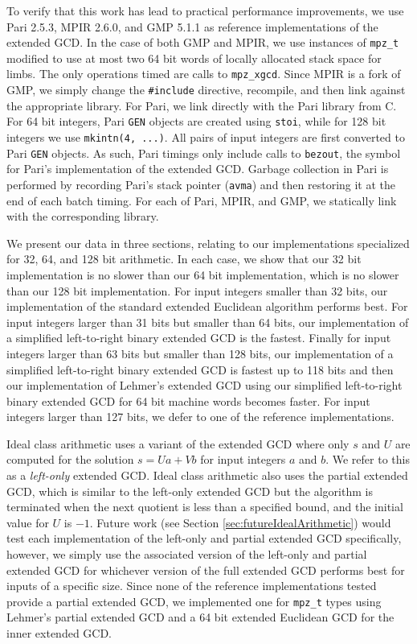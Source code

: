 \documentclass{ucalgthes1}
\theoremstyle{definition}
\newcommand{\GMP}{GMP 5.1.1}
\newcommand{\Pari}{Pari 2.5.3}
\newcommand{\MPIR}{MPIR 2.6.0}
\begin{document}
To verify that this work has lead to practical performance improvements, we use \Pari{}, \MPIR{}, and \GMP{} as reference implementations of the extended GCD.  In the case of both GMP and MPIR, we use instances of \texttt{mpz\_t} modified to use at most two 64 bit words of locally allocated stack space for limbs.  The only operations timed are calls to \texttt{mpz\_xgcd}.  Since MPIR is a fork of GMP, we simply change the \texttt{\#include} directive, recompile, and then link against the appropriate library.  For Pari, we link directly with the Pari library from C.  For 64 bit integers, Pari \texttt{GEN} objects are created using \texttt{stoi}, while for 128 bit integers we use \texttt{mkintn(4, ...)}.  All pairs of input integers are first converted to Pari \texttt{GEN} objects.  As such, Pari timings only include calls to \texttt{bezout}, the symbol for Pari's implementation of the extended GCD.  Garbage collection in Pari is performed by recording Pari's stack pointer (\texttt{avma}) and then restoring it at the end of each batch timing.  For each of Pari, MPIR, and GMP, we statically link with the corresponding library.

We present our data in three sections, relating to our implementations specialized for 32, 64, and 128 bit arithmetic.  In each case, we show that our 32 bit implementation is no slower than our 64 bit implementation, which is no slower than our 128 bit implementation.  For input integers smaller than 32 bits, our implementation of the standard extended Euclidean algorithm performs best.  For input integers larger than 31 bits but smaller than 64 bits, our implementation of a simplified left-to-right binary extended GCD is the fastest.  Finally for input integers larger than 63 bits but smaller than 128 bits, our implementation of a simplified left-to-right binary extended GCD is fastest up to 118 bits and then our implementation of Lehmer's extended GCD using our simplified left-to-right binary extended GCD for 64 bit machine words becomes faster.  For input integers larger than 127 bits, we defer to one of the reference implementations.

Ideal class arithmetic uses a variant of the extended GCD where only $s$ and $U$ are computed for the solution $s = Ua + Vb$ for input integers $a$ and $b$.   We refer to this as a \emph{left-only} extended GCD.  Ideal class arithmetic also uses the partial extended GCD, which is similar to the left-only extended GCD but the algorithm is terminated when the next quotient is less than a specified bound, and the initial value for $U$ is $-1$.  Future work (see Section \ref{sec:futureIdealArithmetic}) would test each implementation of the left-only and partial extended GCD specifically, however, we simply use the associated version of the left-only and partial extended GCD for whichever version of the full extended GCD performs best for inputs of a specific size.  Since none of the reference implementations tested provide a partial extended GCD, we implemented one for \texttt{mpz\_t} types using Lehmer's partial extended GCD and a 64 bit extended Euclidean GCD for the inner extended GCD.
\end{document}
